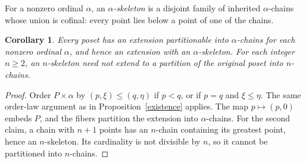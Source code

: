 \documentclass[11pt]{article}
\newtheorem{corollary}[theorem]{Corollary}
\begin{document}
For a nonzero ordinal $\alpha$, an \emph{$\alpha$-skeleton}
\cite[Definition 2.33]{salinas} is a disjoint family of inherited
$\alpha$-chains whose union is cofinal: every point lies below a point of
one of the chains.

\begin{corollary}\label{skeleton}
Every poset has an extension partitionable into $\alpha$-chains for each
nonzero ordinal $\alpha$, and hence an extension with an $\alpha$-skeleton.
For each integer $n\geq2$, an $n$-skeleton need not extend to a partition
of the original poset into $n$-chains.
\end{corollary}
\begin{proof}
Order $P\times\alpha$ by $(p,\xi)\leq(q,\eta)$ if $p<q$, or if $p=q$
and $\xi\leq\eta$. The same order-law argument as in
Proposition~\ref{existence} applies. The map $p\mapsto(p,0)$ embeds $P$,
and the fibers partition the extension into $\alpha$-chains. For the second
claim, a chain with $n+1$ points has an $n$-chain containing its greatest
point, hence an $n$-skeleton. Its cardinality is not divisible by $n$, so
it cannot be partitioned into $n$-chains.
\end{proof}
\end{document}
